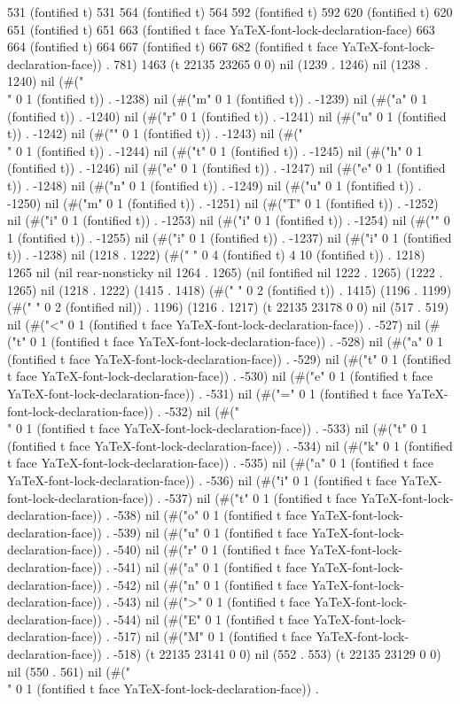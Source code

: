 531 (fontified t) 531 564 (fontified t) 564 592 (fontified t) 592 620 (fontified t) 620 651 (fontified t) 651 663 (fontified t face YaTeX-font-lock-declaration-face) 663 664 (fontified t) 664 667 (fontified t) 667 682 (fontified t face YaTeX-font-lock-declaration-face)) . 781) 1463 (t 22135 23265 0 0) nil (1239 . 1246) nil (1238 . 1240) nil (#("\\" 0 1 (fontified t)) . -1238) nil (#("m" 0 1 (fontified t)) . -1239) nil (#("a" 0 1 (fontified t)) . -1240) nil (#("r" 0 1 (fontified t)) . -1241) nil (#("u" 0 1 (fontified t)) . -1242) nil (#("{" 0 1 (fontified t)) . -1243) nil (#("\\" 0 1 (fontified t)) . -1244) nil (#("t" 0 1 (fontified t)) . -1245) nil (#("h" 0 1 (fontified t)) . -1246) nil (#("e" 0 1 (fontified t)) . -1247) nil (#("e" 0 1 (fontified t)) . -1248) nil (#("n" 0 1 (fontified t)) . -1249) nil (#("u" 0 1 (fontified t)) . -1250) nil (#("m" 0 1 (fontified t)) . -1251) nil (#("T" 0 1 (fontified t)) . -1252) nil (#("i" 0 1 (fontified t)) . -1253) nil (#("i" 0 1 (fontified t)) . -1254) nil (#("}" 0 1 (fontified t)) . -1255) nil (#("i" 0 1 (fontified t)) . -1237) nil (#("i" 0 1 (fontified t)) . -1238) nil (1218 . 1222) (#("          " 0 4 (fontified t) 4 10 (fontified t)) . 1218) 1265 nil (nil rear-nonsticky nil 1264 . 1265) (nil fontified nil 1222 . 1265) (1222 . 1265) nil (1218 . 1222) (1415 . 1418) (#("  " 0 2 (fontified t)) . 1415) (1196 . 1199) (#("  " 0 2 (fontified nil)) . 1196) (1216 . 1217) (t 22135 23178 0 0) nil (517 . 519) nil (#("<" 0 1 (fontified t face YaTeX-font-lock-declaration-face)) . -527) nil (#("t" 0 1 (fontified t face YaTeX-font-lock-declaration-face)) . -528) nil (#("a" 0 1 (fontified t face YaTeX-font-lock-declaration-face)) . -529) nil (#("t" 0 1 (fontified t face YaTeX-font-lock-declaration-face)) . -530) nil (#("e" 0 1 (fontified t face YaTeX-font-lock-declaration-face)) . -531) nil (#("=" 0 1 (fontified t face YaTeX-font-lock-declaration-face)) . -532) nil (#("\\" 0 1 (fontified t face YaTeX-font-lock-declaration-face)) . -533) nil (#("t" 0 1 (fontified t face YaTeX-font-lock-declaration-face)) . -534) nil (#("k" 0 1 (fontified t face YaTeX-font-lock-declaration-face)) . -535) nil (#("a" 0 1 (fontified t face YaTeX-font-lock-declaration-face)) . -536) nil (#("i" 0 1 (fontified t face YaTeX-font-lock-declaration-face)) . -537) nil (#("t" 0 1 (fontified t face YaTeX-font-lock-declaration-face)) . -538) nil (#("o" 0 1 (fontified t face YaTeX-font-lock-declaration-face)) . -539) nil (#("u" 0 1 (fontified t face YaTeX-font-lock-declaration-face)) . -540) nil (#("r" 0 1 (fontified t face YaTeX-font-lock-declaration-face)) . -541) nil (#("a" 0 1 (fontified t face YaTeX-font-lock-declaration-face)) . -542) nil (#("n" 0 1 (fontified t face YaTeX-font-lock-declaration-face)) . -543) nil (#(">" 0 1 (fontified t face YaTeX-font-lock-declaration-face)) . -544) nil (#("E" 0 1 (fontified t face YaTeX-font-lock-declaration-face)) . -517) nil (#("M" 0 1 (fontified t face YaTeX-font-lock-declaration-face)) . -518) (t 22135 23141 0 0) nil (552 . 553) (t 22135 23129 0 0) nil (550 . 561) nil (#("\\" 0 1 (fontified t face YaTeX-font-lock-declaration-face)) . 